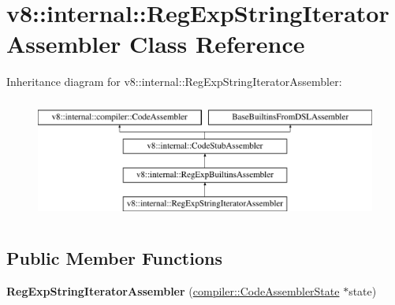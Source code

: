\hypertarget{classv8_1_1internal_1_1RegExpStringIteratorAssembler}{}\section{v8\+:\+:internal\+:\+:Reg\+Exp\+String\+Iterator\+Assembler Class Reference}
\label{classv8_1_1internal_1_1RegExpStringIteratorAssembler}
Inheritance diagram for v8\+:\+:internal\+:\+:Reg\+Exp\+String\+Iterator\+Assembler\+:\begin{figure}[H]
\begin{center}
\leavevmode
\includegraphics[height=4.000000cm]{classv8_1_1internal_1_1RegExpStringIteratorAssembler}
\end{center}
\end{figure}
\subsection*{Public Member Functions}
\begin{DoxyCompactItemize}
\item 
\mbox{\label{classv8_1_1internal_1_1RegExpStringIteratorAssembler_abc10df286fa0ed3cd21dacfaa4ce6129}} 
{\bfseries Reg\+Exp\+String\+Iterator\+Assembler} (\mbox{\hyperlink{classv8_1_1internal_1_1compiler_1_1CodeAssemblerState}{compiler\+::\+Code\+Assembler\+State}} $\ast$state)
\end{DoxyCompactItemize}
